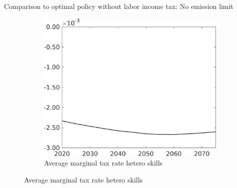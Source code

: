\documentclass[11pt,aspectratio=169]{beamer}
\begin{document}
\begin{frame}{Comparison to optimal policy without labor income tax: No emission limit}
\begin{figure}[h!!]
\begin{subfigure}{0.32\textwidth}
		\end{subfigure}	
	\begin{subfigure}{0.32\textwidth}		
		\caption{Average marginal tax rate hetero skills}
		\includegraphics[width=1\textwidth]{../codding_model/own_basedOnFried/optimalPol_010922_revision/figures/all_13Sept22_Tplus30/dTaulAv_OPT_NOT_NoTaus_COMPtaul_regime4_spillover0_knspil0_noskill0_sep0_xgrowth0_PV1_etaa0.79_lgd0.png}
	\end{subfigure}
	\end{figure}
\end{frame}
\end{document}
